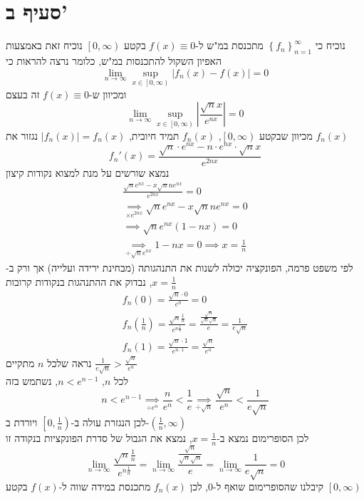 \documentclass[12pt, titlepage]{article}
\begin{document}
\section*{סעיף ב'}
נוכיח כי $\left\{f_n\right\}_{n=1}^\infty$ מתכנסת במ"ש ל-$f\left(x\right) \equiv 0$ בקטע $\left[0,\infty\right)$
נוכיח זאת  באמצעות האפיון השקול להתכנסות במ"ש, כלומר נרצה להראות כי
\[
    \lim_{n\to\infty} \sup_{x\in\left[0,\infty\right)} \left|f_n\left(x\right) - f\left(x\right) \right| = 0
\]
ומכיוון ש-$f\left(x\right)\equiv 0$ זה בעצם
\[
    \lim_{n\to\infty} \sup_{x\in\left[0,\infty\right)} \left|\frac{\sqrt{n}x}{e^{nx}} \right| = 0
\]
מכיוון שבקטע $\left[0,\infty\right)$, $f_n(x)$ תמיד חיובית, $|f_n(x)| = f_n(x)$
נגזור את $f_n(x)$
\[
    f_n'(x) = \frac{\sqrt{n}\cdot e^{nx} - n\cdot e^{nx} \cdot \sqrt{n}x}{e^{2nx}}
\]
נמצא שורשים על מנת למצוא נקודות קיצון
\begin{gather*}
    \frac{\sqrt{n}e^{nx} - x\sqrt{n}ne^{nx}}{e^{2nx}} = 0\\
    \underset{\times e^{2nx}}{\implies} \sqrt{n}e^{nx} - x\sqrt{n}ne^{nx} = 0 \\
    \implies \sqrt{n}e^{nx} \left(1-nx\right) = 0 \\
    \underset{\div \sqrt{n}e^{nx}}{\implies} 1-nx = 0
    \implies x= \frac{1}{n}
\end{gather*}
לפי משפט פרמה, הפונקציה יכולה לשנות את התנהגותה (מבחינת ירידה ועלייה) אך ורק ב-$x=\frac{1}{n}$, נבדוק את ההתנהגות בנקודות קרובות
\begin{gather*}
    f_n\left(0\right) = \frac{\sqrt{n}\cdot 0}{e^0} = 0 \\
    f_n\left(\frac{1}{n}\right) = \frac{\sqrt{n}\frac{1}{n}}{e^{n\frac{1}{n}}} = \frac{\frac{\sqrt{n}}{\sqrt{n}\sqrt{n}}}{e}= \frac{1}{e\sqrt{n}}\\
    f_n(1) = \frac{\sqrt{n}\cdot 1}{e^{n\cdot 1}}= \frac{\sqrt{n}}{e^n}
\end{gather*}
נראה שלכל $n$ מתקיים $\frac{1}{e\sqrt{n}} > \frac{\sqrt{n}}{e^n}$\\
לכל $n$, $n < e^{n-1}$, נשתמש בזה
\[
    n < e^{n-1} \underset{\div e^n}{\implies} \frac{n}{e^n} < \frac{1}{e} \underset{\div \sqrt{n}}{\implies} \frac{\sqrt{n}}{e^n} < \frac{1}{e\sqrt{n}}
\]
לכן הנגזרת עולה ב-$\left[0,\frac{1}{n}\right)$ ויורדת ב-$\left(\frac{1}{n},\infty\right)$\\
לכן הסופרימום נמצא ב-$x=\frac{1}{n}$,
נמצא את הגבול של סדרת הפונקציות בנקודה זו
\[
    \lim_{n\to\infty} \frac{\sqrt{n}\frac{1}{n}}{e^{n\frac{1}{n}}} = \lim_{n\to\infty} \frac{\frac{\sqrt{n}}{\sqrt{n}\sqrt{n}}}{e} = \lim_{n\to\infty} \frac{1}{e\sqrt{n}} = 0
\]
קיבלנו שהסופרימום שואף ל-$0$, לכן $f_n(x)$ מתכנסת במידה שווה ל-$f\left(x\right)$ בקטע $\left[0,\infty\right)$
\newpage
\end{document}
